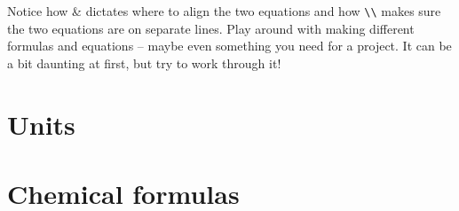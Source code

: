 \documentclass[a4paper,oneside]{memoir}
\begin{document}
Notice how \& dictates where to align the two equations and how \lstinline$\\$ makes sure the two equations are on separate lines. Play around with making different formulas and equations -- maybe even something you need for a project. It can be a bit daunting at first, but try to work through it!

\section{Units}

\section{Chemical formulas}
\end{document}
